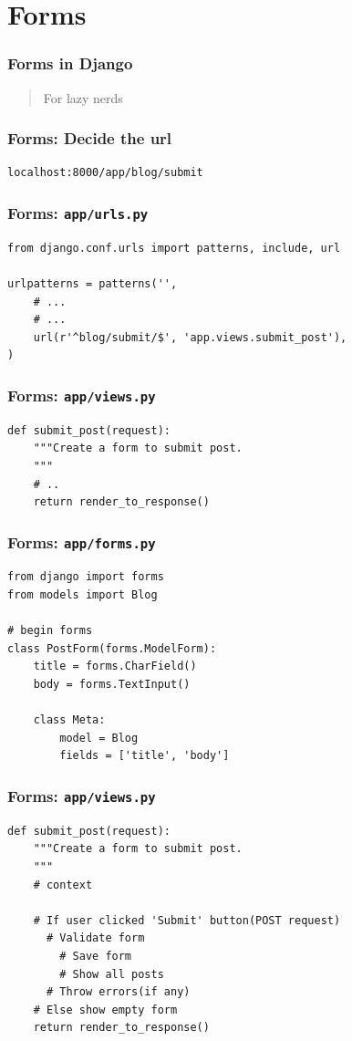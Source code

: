 \documentclass[bigger, presentation]{beamer}
\begin{document}
\section{Forms}
\label{sec-4}
\begin{frame}
\frametitle{Forms in Django}
\label{sec-4-1}

   
\begin{quote}
For lazy nerds
\end{quote}
\end{frame}
\begin{frame}[fragile]
\frametitle{Forms: Decide the url}
\label{sec-4-2}



\begin{verbatim}
localhost:8000/app/blog/submit
\end{verbatim}
\end{frame}
\begin{frame}[fragile]
\frametitle{Forms: \texttt{app/urls.py}}
\label{sec-4-3}



\begin{verbatim}
from django.conf.urls import patterns, include, url

urlpatterns = patterns('',
    # ...
    # ...
    url(r'^blog/submit/$', 'app.views.submit_post'),
)
\end{verbatim}
\end{frame}
\begin{frame}[fragile]
\frametitle{Forms: \texttt{app/views.py}}
\label{sec-4-4}



\begin{verbatim}
def submit_post(request):
    """Create a form to submit post.
    """
    # ..
    return render_to_response()
\end{verbatim}
\end{frame}
\begin{frame}[fragile]
\frametitle{Forms: \texttt{app/forms.py}}
\label{sec-4-5}



\begin{verbatim}
from django import forms
from models import Blog

# begin forms
class PostForm(forms.ModelForm):
    title = forms.CharField()
    body = forms.TextInput()

    class Meta:
        model = Blog
        fields = ['title', 'body']
\end{verbatim}
\end{frame}
\begin{frame}[fragile]
\frametitle{Forms: \texttt{app/views.py}}
\label{sec-4-6}



\begin{verbatim}
def submit_post(request):
    """Create a form to submit post.
    """
    # context

    # If user clicked 'Submit' button(POST request)
      # Validate form
        # Save form
        # Show all posts
      # Throw errors(if any)
    # Else show empty form
    return render_to_response()
\end{verbatim}
\end{frame}
\end{document}
